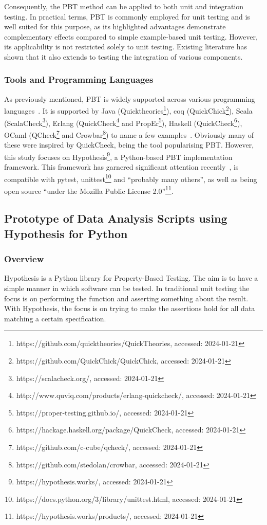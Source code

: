 \documentclass[runningheads]{llncs}
\begin{document}
Consequently, the PBT method can be applied to both unit and integration testing. In practical terms, PBT is commonly employed for unit testing and is well suited for this purpose, as its highlighted advantages demonstrate complementary effects compared to simple example-based unit testing. However, its applicability is not restricted solely to unit testing. Existing literature has shown that it also extends to testing the integration of various components.

\subsubsection{Tools and Programming Languages}
As previously mentioned, PBT is widely supported across various programming languages~\cite{Chen2022,Shi2023}. It is supported by Java (Quicktheories\footnote{https://github.com/quicktheories/QuickTheories, accessed: 2024-01-21}), coq (QuickChick\footnote{https://github.com/QuickChick/QuickChick, accessed: 2024-01-21}), Scala (ScalaCheck\footnote{https://scalacheck.org/, accessed: 2024-01-21}), Erlang (QuickCheck\footnote{http://www.quviq.com/products/erlang-quickcheck/, accessed: 2024-01-21} and PropEr\footnote{https://proper-testing.github.io/, accessed: 2024-01-21}), Haskell (QuickCheck\footnote{https://hackage.haskell.org/package/QuickCheck, accessed: 2024-01-21}), OCaml (QCheck\footnote{https://github.com/c-cube/qcheck/, accessed: 2024-01-21} and Crowbar\footnote{https://github.com/stedolan/crowbar, accessed: 2024-01-21}) to name a few examples~\cite{MacIver2016,Padhye2019,Paraskevopoulou2015,Arts2008,Papadakis2011,Claessen2000}. Obviously many of these were inspired by QuickCheck, being the tool popularising PBT. However, this study focuses on Hypothesis\footnote{https://hypothesis.works/, accessed: 2024-01-21}, a Python-based PBT implementation framework. This framework has garnered significant attention recently~\cite{Corgozinho2023,MacIver2019}, is compatible with pytest, unittest\footnote{https://docs.python.org/3/library/unittest.html, accessed: 2024-01-21} and ``probably many others'', as well as being open source ``under the Mozilla Public License 2.0''\footnote{https://hypothesis.works/products/, accessed: 2024-01-21}.

\subsection{Prototype of Data Analysis Scripts using Hypothesis for Python}
\subsubsection{Overview}
Hypothesis is a Python library for Property-Based Testing. The aim is to have a simple manner in which software can be tested. In traditional unit testing the focus is on performing the function and asserting something about the result. With Hypothesis, the focus is on trying to make the assertions hold for all data matching a certain specification.
\end{document}
